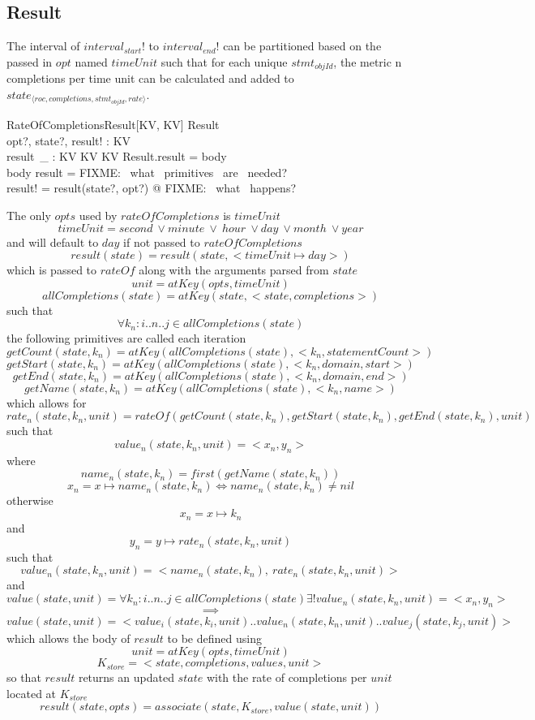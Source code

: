 \documentclass[../main.tex]{subfiles}
\begin{document}
\subsection{Result}
The interval of $interval_{start}!$ to $interval_{end}!$ can be partitioned based on the passed in
$opt$ named $timeUnit$ such that for each unique $stmt_{objId}$, the metric n completions per time unit
can be calculated and added to $state_{\langle roc, completions, stmt_{objId}, rate \rangle}$.
\begin{schema}{RateOfCompletionsResult[KV, KV]}
  Result \\
  opt?, state?, result! : KV \\
  result~\_ : KV \cross KV \surj KV
  \where
  Result.result = \langle body \rangle \\
  \langle body \rangle \bindsto result = \langle FIXME: ~what ~primitives ~are ~needed? \rangle \\
  result! = result(state?, opt?) @ FIXME: ~what ~happens?
\end{schema}
The only $opts$ used by $rateOfCompletions$ is $timeUnit$
$$timeUnit = second \ \lor minute \ \lor \ hour \ \lor day \ \lor month \ \lor year$$
and will default to $day$ if not passed to $rateOfCompletions$
$$result(state) = result(state, <timeUnit \mapsto day>)$$
which is passed to $rateOf$ along with the arguments parsed from $state$
$$unit = atKey(opts, timeUnit)$$
$$allCompletions(state) = atKey(state, <state, completions>)$$
such that
$$\forall k_{n} : i..n..j \in allCompletions(state)$$
the following primitives are called each iteration
$$getCount(state, k_{n}) = atKey(allCompletions(state), <k_{n}, statementCount>)$$
$$getStart(state, k_{n}) = atKey(allCompletions(state), <k_{n}, domain, start>)$$
$$getEnd(state, k_{n}) = atKey(allCompletions(state), <k_{n}, domain, end>)$$
$$getName(state, k_{n}) = atKey(allCompletions(state), <k_{n}, name>) $$
which allows for
$$rate_{n}(state, k_{n}, unit) = rateOf(getCount(state, k_{n}), getStart(state, k_{n}), getEnd(state, k_{n}), unit)$$
such that
$$value_{n}(state, k_{n}, unit) = <x_{n}, y_{n}>$$
where
$$name_{n}(state, k_{n}) = first(getName(state, k_{n}))$$
$$x_{n} = x \mapsto name_{n}(state, k_{n}) \iff name_{n}(state, k_{n}) \not = nil$$
otherwise
$$x_{n} = x \mapsto k_{n}$$
and
$$y_{n} = y \mapsto rate_{n}(state, k_{n}, unit)$$
such that
$$value_{n}(state, k_{n}, unit) = <name_{n}(state, k_{n}), \ rate_{n}(state, k_{n}, unit)>$$
and
$$value(state, unit) = \forall k_{n} : i..n..j \in allCompletions(state) \exists! value_{n}(state, k_{n}, unit) = <x_{n}, y_{n}>$$
$$\implies$$
$$value(state, unit) = <value_{i}(state, k_{i}, unit)..value_{n}(state, k_{n}, unit)..value_{j}(state, k_{j}, unit)>$$
which allows the body of $result$ to be defined using
$$unit = atKey(opts, timeUnit)$$
$$K_{store} = <state, completions, values, unit>$$
so that $result$ returns an updated $state$ with the rate of completions per $unit$ located at $K_{store}$
$$result(state, opts) = associate(state, K_{store}, value(state, unit))$$
\end{document}

